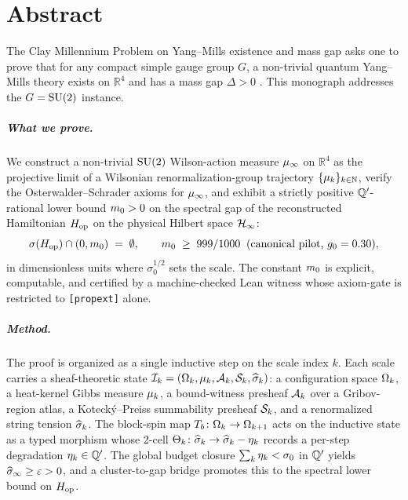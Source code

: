 %

\chapter*{Abstract}

The Clay Millennium Problem on Yang--Mills existence and mass gap
asks one to prove that for any compact simple gauge group $G$, a
non-trivial quantum Yang--Mills theory exists on $\mathbb{R}^4$ and
has a mass gap $\Delta > 0$
\cite{JaffeWitten2006}.  This monograph addresses the $G = \mathrm{SU}(2)$
instance.

\paragraph*{What we prove.}  We construct a non-trivial $\mathrm{SU}(2)$
Wilson-action measure $\mu_\infty$ on $\mathbb{R}^4$ as the projective
limit of a Wilsonian renormalization-group trajectory
$\{\mu_k\}_{k \in \mathbb{N}}$, verify the Osterwalder--Schrader
axioms for $\mu_\infty$, and exhibit a strictly positive
$\mathbb{Q}'$-rational lower bound $m_0 > 0$ on the spectral gap of
the reconstructed Hamiltonian $H_{\mathrm{op}}$ on the physical Hilbert space
$\mathcal{H}_\infty$:
\[
  \sigma(H_{\mathrm{op}}) \cap (0, m_0) \;=\; \emptyset,
  \qquad
  m_0 \;\ge\; 999/1000 \;\;\text{(canonical pilot, $g_0 = 0.30$)},
\]
in dimensionless units where $\sigma_0^{1/2}$ sets the scale.  The
constant $m_0$ is explicit, computable, and certified by a
machine-checked Lean witness whose axiom-gate is restricted to
\texttt{[propext]} alone.

\paragraph*{Method.}  The proof is organized as a single inductive
step on the scale index $k$.  Each scale carries a sheaf-theoretic
state $\mathcal{I}_k = (\Omega_k, \mu_k, \mathcal{A}_k, \mathcal{S}_k, \widehat{\sigma}_k)$: a configuration space
$\Omega_k$, a heat-kernel Gibbs measure $\mu_k$, a bound-witness presheaf
$\mathcal{A}_k$ over a Gribov-region atlas, a Kotecký--Preiss summability
presheaf $\mathcal{S}_k$, and a renormalized string tension $\widehat{\sigma}_k$.  The
block-spin map $T_b \colon \Omega_k \to \Omega_{k+1}$ acts on the inductive
state as a typed morphism whose 2-cell $\Theta_k \colon \widehat{\sigma}_k \to
\widehat{\sigma}_k - \eta_k$ records a per-step degradation $\eta_k \in \mathbb{Q}'$.  The
global budget closure $\sum_k \eta_k < \sigma_0$ in $\mathbb{Q}'$ yields
$\widehat{\sigma}_\infty \ge \varepsilon > 0$, and a cluster-to-gap bridge promotes
this to the spectral lower bound on $H_{\mathrm{op}}$.

